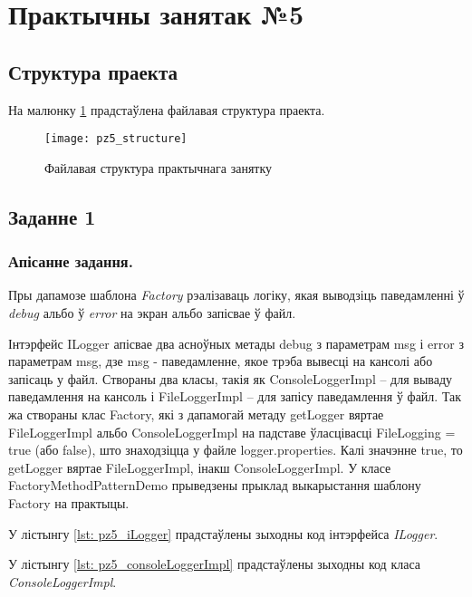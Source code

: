 \section{Практычны занятак №5}

\subsection{Структура праекта}

На малюнку \ref{img: pz5} прадстаўлена файлавая структура праекта.

\begin{figure}[h!]
    \centering
    \texttt{[image: pz5\_structure]}
    \caption{Файлавая структура практычнага занятку}
    \label{img: pz5} 
\end{figure}

\subsection{Заданне 1}

\subsubsection{Апісанне задання.}

Пры дапамозе шаблона \textit{Factory} рэалізаваць логіку,
якая выводзіць паведамленні ў \textit{debug} альбо ў \textit{error}
на экран альбо запісвае ў файл.

Інтэрфейс ILogger апісвае два асноўных метады debug з параметрам msg і error з параметрам msg, дзе msg - паведамленне, якое трэба вывесці на кансолі або запісаць у файл. Створаны два класы, такія як ConsoleLoggerImpl -- для вываду паведамлення на кансоль і FileLoggerImpl -- для запісу паведамлення ў файл. Так жа створаны клас Factory, які з дапамогай метаду getLogger вяртае FileLoggerImpl альбо ConsoleLoggerImpl на падставе ўласцівасці FileLogging = true (або false), што знаходзіцца у файле logger.properties. Калі значэнне true, то getLogger вяртае FileLoggerImpl, інакш ConsoleLoggerImpl. У класе FactoryMethodPatternDemo прыведзены прыклад выкарыстання шаблону Factory на практыцы.

У лістынгу \ref{lst: pz5_iLogger} прадстаўлены зыходны код інтэрфейса \textit{ILogger}.



У лістынгу \ref{lst: pz5_consoleLoggerImpl} прадстаўлены зыходны код класа \textit{ConsoleLoggerImpl}.

